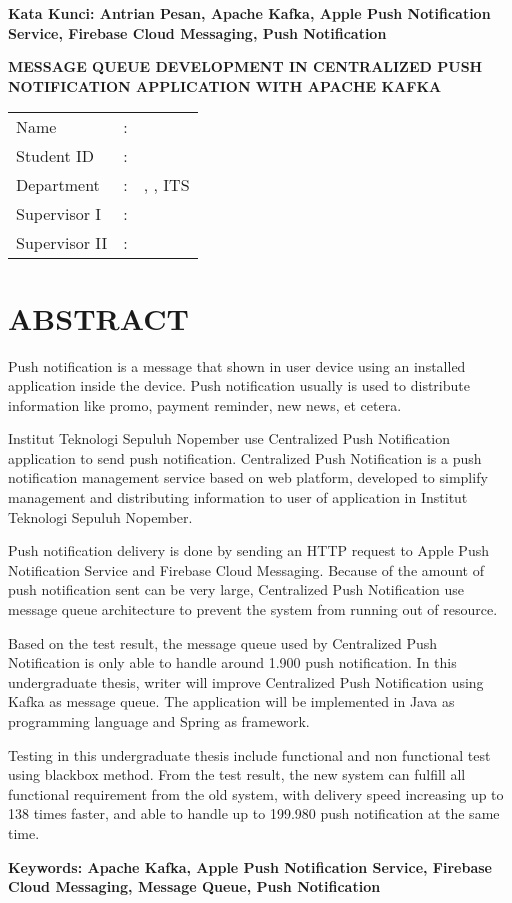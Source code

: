 \vspace*{1em}
\noindent\bfseries Kata Kunci: Antrian Pesan, Apache Kafka, Apple Push Notification Service, Firebase Cloud Messaging, Push Notification
\normalfont
\cleardoublepage

\begin{center}
	\noindent\textbf{\MakeUppercase{Message Queue Development in Centralized Push Notification Application with Apache Kafka}}
\end{center}
\vspace*{1em}

\noindent\begin{tabularx}{\linewidth}{l l X}
	Name 			& : & \penulis \\
	Student ID		& :	& \nrp \\
	Department 		& : & \jurusaneng, \newline \fakultaseng, ITS \\
	Supervisor I 	& : & \pembimbingsatu \\
	Supervisor II 	& : & \pembimbingdua
\end {tabularx}

{\let\clearpage\relax\titlespacing{\chapter}{0em}{0em}{1em} \chapter{ABSTRACT}}
\itshape
\par Push notification is a message that shown in user device using an installed application inside the device. Push notification usually is used to distribute information like promo, payment reminder, new news, et cetera.
\par Institut Teknologi Sepuluh Nopember use Centralized Push Notification application to send push notification. Centralized Push Notification is a push notification management service based on web platform, developed to simplify management and distributing information to user of application in Institut Teknologi Sepuluh Nopember.
\par Push notification delivery is done by sending an HTTP request to Apple Push Notification Service and Firebase Cloud Messaging. Because of the amount of push notification sent can be very large, Centralized Push Notification use message queue architecture to prevent the system from running out of resource.
\par Based on the test result, the message queue used by Centralized Push Notification is only able to handle around 1.900 push notification. In this undergraduate thesis, writer will improve Centralized Push Notification using Kafka as message queue. The application will be implemented in Java as programming language and Spring as framework.
\par Testing in this undergraduate thesis include functional and non functional test using blackbox method. From the test result, the new system can fulfill all functional requirement from the old system, with delivery speed increasing up to 138 times faster, and able to handle up to 199.980 push notification at the same time.

\vspace*{1em}
\noindent\bfseries Keywords: Apache Kafka, Apple Push Notification Service, Firebase Cloud Messaging, Message Queue, Push Notification
\normalfont
\cleardoublepage